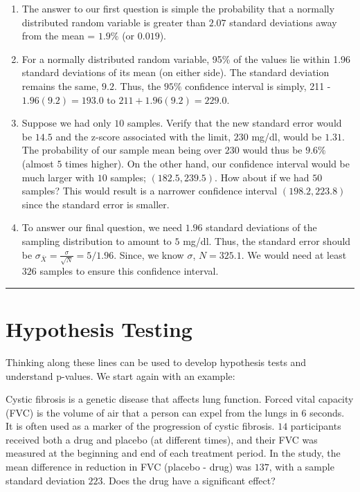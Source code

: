 \documentclass[]{book}
\providecommand{\tightlist}{%
  \setlength{\itemsep}{0pt}\setlength{\parskip}{0pt}}
\begin{document}
\begin{enumerate}
\def\labelenumi{\arabic{enumi}.}
\tightlist
\item
  The answer to our first question is simple the probability that a
  normally distributed random variable is greater than \(2.07\) standard
  deviations away from the mean = \(1.9\%\) (or \(0.019\)).
\item
  For a normally distributed random variable, 95\% of the values lie
  within 1.96 standard deviations of its mean (on either side). The
  standard deviation remains the same, \(9.2\). Thus, the \(95\%\)
  confidence interval is simply, 211 - \(1.96(9.2) = 193.0\) to
  \(211 + 1.96(9.2) = 229.0\).
\item
  Suppose we had only \(10\) samples. Verify that the new standard error
  would be \(14.5\) and the z-score associated with the limit, \(230\)
  mg/dl, would be \(1.31\). The probability of our sample mean being
  over \(230\) would thus be \(9.6\%\) (almost \(5\) times higher). On
  the other hand, our confidence interval would be much larger with
  \(10\) samples; \((182.5, 239.5)\). How about if we had \(50\)
  samples? This would result is a narrower confidence interval
  \((198.2, 223.8)\) since the standard error is smaller.
\item
  To answer our final question, we need \(1.96\) standard deviations of
  the sampling distribution to amount to \(5\) mg/dl. Thus, the standard
  error should be
  \(\sigma_{\bar{X}} = \frac{\sigma}{\sqrt{N}} = 5/1.96.\) Since, we
  know \(\sigma\), \(N = 325.1\). We would need at least \(326\) samples
  to ensure this confidence interval.
\end{enumerate}

\begin{center}\rule{0.5\linewidth}{\linethickness}\end{center}

\section{Hypothesis Testing}\label{hypothesis-testing}

Thinking along these lines can be used to develop hypothesis tests and
understand p-values. We start again with an example:

Cystic fibrosis is a genetic disease that affects lung function. Forced
vital capacity (FVC) is the volume of air that a person can expel from
the lungs in \(6\) seconds. It is often used as a marker of the
progression of cystic fibrosis. \(14\) participants received both a drug
and placebo (at different times), and their FVC was measured at the
beginning and end of each treatment period. In the study, the mean
difference in reduction in FVC (placebo - drug) was \(137\), with a
sample standard deviation \(223\). Does the drug have a significant
effect?
\end{document}
